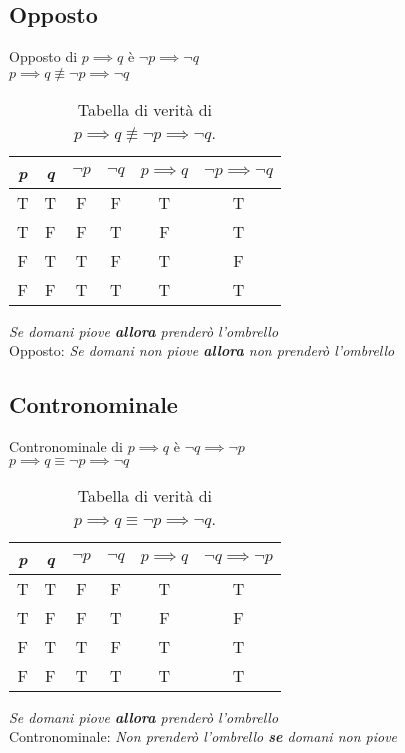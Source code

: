 \subsection{Opposto}
Opposto di $p \implies q$ è  $\neg p \implies \neg q$ \\
$p \implies q \not\equiv \neg p \implies \neg q$
\begin{table}[H]
    \centering    
    \caption{\label{tab:true_table_opposto}Tabella di verità di $p \implies q \not\equiv \neg p \implies \neg q$.}
    \begin{tabular}{|c | c | c | c | c || c ||} 
     \hline
     \textit{p} & \textit{q} & $\neg p$ & $\neg q$ & $p \implies q$ & $\neg p \implies \neg q$ \\
     \hline\hline
     T & T & F & F & T & T\\ 
     \hline
     T & F & F & T & F & T\\
     \hline
     F & T & T & F & T & F\\
     \hline
     F & F & T & T & T & T\\
     \hline
    \end{tabular}
\end{table}
\begin{example}
\emph{Se domani piove \textbf{allora} prenderò l'ombrello} \\
Opposto: \emph{Se domani non piove \textbf{allora} non prenderò l'ombrello}
\end{example}

\subsection{Contronominale}
Contronominale di $p \implies q$ è  $\neg q \implies \neg p$ \\
$p \implies q \equiv \neg p \implies \neg q$
\begin{table}[H]
    \centering    
    \caption{\label{tab:true_table_contronominale}Tabella di verità di $p \implies q \equiv \neg p \implies \neg q$.}
    \begin{tabular}{|c | c | c | c | c || c ||} 
     \hline
     \textit{p} & \textit{q} & $\neg p$ & $\neg q$ & $p \implies q$ & $\neg q \implies \neg p$ \\
     \hline\hline
     T & T & F & F & T & T\\ 
     \hline
     T & F & F & T & F & F\\
     \hline
     F & T & T & F & T & T\\
     \hline
     F & F & T & T & T & T\\
     \hline
    \end{tabular}
\end{table}
\begin{example}
\emph{Se domani piove \textbf{allora} prenderò l'ombrello} \\
Contronominale: \emph{Non prenderò l'ombrello \textbf{se} domani non piove}
\end{example}

